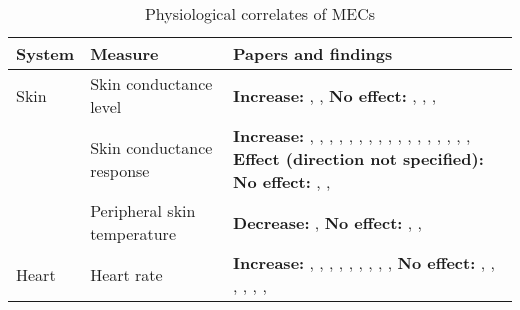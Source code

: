 \begin{table}[t!]
\centering
\scriptsize
\def\arraystretch{1.2}

\begin{threeparttable}
\caption{Physiological correlates of MECs}
\label{tab:rev-3}

\begin{tabular*}{\textwidth}{
    >{\raggedright}p{}
    >{\raggedright}p{}
    >{\raggedright\arraybackslash}p{}}

\hline

\textbf{System} & \textbf{Measure} & \textbf{Papers and findings} \\ 

\hline
Skin & Skin conductance level & 
    \textbf{Increase:} \textcite{benedek2011}, \textcite{grewe2009a}, \textcite{mori2017} 
    \newline 
    \textbf{No effect:} \textcite{baltes2011}, \textcite{carr2016}, \textcite{jaimovich2013}, \textcite{schafer2011} \\ 

\cline{2-3}   
& Skin conductance response & 
    \textbf{Increase:} \textcite{bannister2018}, \textcite{benedek2011}, \textcite{craig2005}, \textcite{egermann2011}, \textcite{grewe2007}, \textcite{grewe2009a}, \textcite{grewe2011}, \textcite{guhn2007}, \textcite{klepzig2020}, \textcite{masherrero2014}, \textcite{mori2014b}, \textcite{mori2015}, \textcite{mori2017}, \textcite{polo2017}, \textcite{rickard2004}, \textcite{sachs2016}, \textcite{salimpoor2009}, \textcite{salimpoor2011} 
    \newline 
    \textbf{Effect (direction not specified):} \textcite{grewe2007} 
    \newline 
    \textbf{No effect:} \textcite{blood2001}, \textcite{carr2016}, \textcite{jaimovich2013} \\

\cline{2-3}
& Peripheral skin temperature & 
    \textbf{Decrease:} \textcite{salimpoor2009}, \textcite{salimpoor2011} 
    \newline 
    \textbf{No effect:} \textcite{blood2001}, \textcite{craig2005}, \textcite{rickard2004} \\

\hline
Heart & Heart rate & 
    \textbf{Increase:} \textcite{benedek2011}, \textcite{blood2001}, \textcite{grewe2009a}, \textcite{guhn2007}, \textcite{masherrero2014}, \textcite{polo2017}, \textcite{sachs2016}, \textcite{salimpoor2009}, \textcite{salimpoor2011}, \textcite{sumpf2015} 
    \newline 
    \textbf{No effect:} \textcite{baltes2011}, \textcite{carr2016}, \textcite{grewe2011}, \textcite{jaimovich2013}, \textcite{mori2017}, \textcite{rickard2004}, \textcite{schafer2011} \\


\end{tabular*}
\end{threeparttable}
\end{table}
